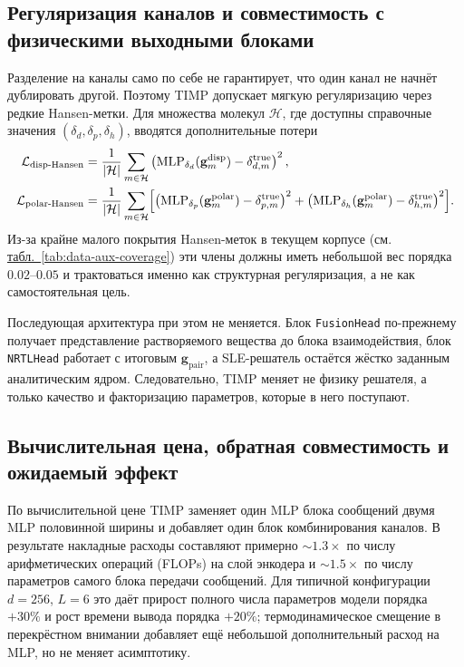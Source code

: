 \documentclass[11pt]{article}
\begin{document}
\subsection{Регуляризация каналов и совместимость с физическими выходными блоками}

Разделение на каналы само по себе не гарантирует, что один канал не начнёт дублировать другой. Поэтому TIMP допускает мягкую регуляризацию через редкие Hansen-метки. Для множества молекул $\mathcal{H}$, где доступны справочные значения $(\delta_d,\delta_p,\delta_h)$, вводятся дополнительные потери
\begin{align*}
\mathcal{L}_{\mathrm{disp\text{-}Hansen}} &= \frac{1}{|\mathcal{H}|}\sum_{m\in\mathcal{H}}\left(\mathrm{MLP}_{\delta_d}(\mathbf{g}_m^{\mathrm{disp}}) - \delta_{d,m}^{\mathrm{true}}\right)^2, \\
\mathcal{L}_{\mathrm{polar\text{-}Hansen}} &= \frac{1}{|\mathcal{H}|}\sum_{m\in\mathcal{H}}\Bigl[\left(\mathrm{MLP}_{\delta_p}(\mathbf{g}_m^{\mathrm{polar}}) - \delta_{p,m}^{\mathrm{true}}\right)^2 + \left(\mathrm{MLP}_{\delta_h}(\mathbf{g}_m^{\mathrm{polar}}) - \delta_{h,m}^{\mathrm{true}}\right)^2\Bigr].
\end{align*}
Из-за крайне малого покрытия Hansen-меток в текущем корпусе (см. \hyperref[tab:data-aux-coverage]{табл.~\ref*{tab:data-aux-coverage}}) эти члены должны иметь небольшой вес порядка $0.02$--$0.05$ и трактоваться именно как структурная регуляризация, а не как самостоятельная цель.

Последующая архитектура при этом не меняется. Блок \texttt{FusionHead} по-прежнему получает представление растворяемого вещества до блока взаимодействия, блок \texttt{NRTLHead} работает с итоговым $\mathbf{g}_{\mathrm{pair}}$, а SLE-решатель остаётся жёстко заданным аналитическим ядром. Следовательно, TIMP меняет не физику решателя, а только качество и факторизацию параметров, которые в него поступают.

\subsection{Вычислительная цена, обратная совместимость и ожидаемый эффект}

По вычислительной цене TIMP заменяет один MLP блока сообщений двумя MLP половинной ширины и добавляет один блок комбинирования каналов. В результате накладные расходы составляют примерно $\sim 1.3\times$ по числу арифметических операций (FLOPs) на слой энкодера и $\sim 1.5\times$ по числу параметров самого блока передачи сообщений. Для типичной конфигурации $d=256$, $L=6$ это даёт прирост полного числа параметров модели порядка $+30\%$ и рост времени вывода порядка $+20\%$; термодинамическое смещение в перекрёстном внимании добавляет ещё небольшой дополнительный расход на MLP, но не меняет асимптотику.
\end{document}
